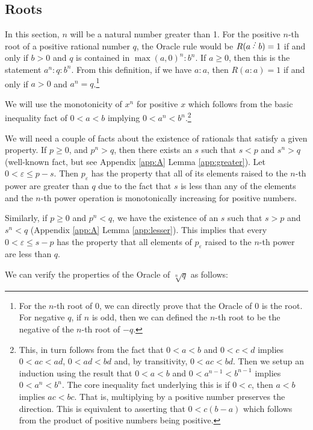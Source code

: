 \documentclass[12pt]{article}
\begin{document}
\subsection{Roots}\label{sec:roots}

In this section, $n$ will be a natural number greater than 1. For the positive $n$-th root of a positive rational number $q$, the Oracle rule would be $R(a\lte b) = 1$ if and only if $b> 0$ and $q$ is contained in $\max(a,0)^n:b^n$. If $a\geq 0$, then this is the statement $a^n:q:b^n$. From this definition, if we have $a:a$, then $R(a:a) = 1$ if and only if $a>0$ and $a^n = q$.\footnote{For the $n$-th root of $0$, we can directly prove that the Oracle of 0 is the root. For negative $q$, if $n$ is odd, then we can defined the $n$-th root to be the negative of the $n$-th root of $-q$.}

We will use the monotonicity of $x^n$ for positive $x$ which follows from the basic inequality fact of $ 0 < a < b$ implying $0 < a^n < b^n$.\footnote{This, in turn follows from the fact that $0<a<b$ and $0<c<d$ implies $0<ac<ad$, $0<ad<bd$ and, by transitivity, $0<ac<bd$. Then we setup an induction using the result that $0 < a<b$ and $0 < a^{n-1} < b^{n-1}$ implies $0 < a^n < b^n$. The core inequality fact underlying this is if $0<c$, then $a<b$ implies $ac < bc$. That is, multiplying by a positive number preserves the direction. This is equivalent to asserting that $0 < c (b-a)$ which follows from the product of positive numbers being positive.}

We will need a couple of facts about the existence of rationals that satisfy a given property. If $p \geq 0$, and $p^n > q$, then there exists an $s$ such that $s<p$ and $s^n > q$ (well-known fact, but see Appendix \ref{app:A} Lemma \ref{app:greater}). Let $0 < \varepsilon \leq p-s$. Then $p_\varepsilon$ has the property that all of its elements raised to the $n$-th power are greater than $q$ due to the fact that $s$ is less than any of the elements and the $n$-th power operation is monotonically increasing for positive numbers. 

Similarly, if $p \geq 0$ and $p^n < q$, we have the existence of an $s$ such that $s > p$ and $s^n < q$ (Appendix \ref{app:A} Lemma \ref{app:lesser}). This implies that every $0 < \varepsilon \leq s-p$ has the property that all elements of $p_\varepsilon$ raised to the $n$-th power are less than $q$. 

We can verify the properties of the Oracle of $\sqrt[n]{q}$ as follows: 
\end{document}

